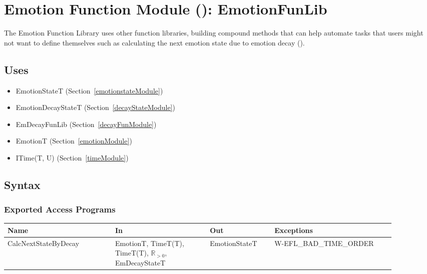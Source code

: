 \section{Emotion Function Module ():
EmotionFunLib}\label{emotionFunModule}

The Emotion Function Library uses other function libraries, building compound
methods that can help automate tasks that users might not want to define
themselves such as calculating the next emotion state due to emotion decay
().

\subsection{Uses}
\begin{itemize}[noitemsep, nosep]

    \item EmotionStateT (Section~\ref{emotionstateModule})

    \item EmotionDecayStateT (Section~\ref{decayStateModule})

    \item EmDecayFunLib (Section~\ref{decayFunModule})

    \item EmotionT (Section~\ref{emotionModule})

    \item ITime(T, U) (Section~\ref{timeModule})

\end{itemize}

\subsection{Syntax}

\subsubsection{Exported Access Programs}

\begin{center}
    \renewcommand{\arraystretch}{1.2}
    \begin{tabular}{m{0.25\linewidth} m{0.22\linewidth} m{0.15\linewidth}
            m{0.28\linewidth}}
        \toprule
        \textbf{Name} & \textbf{In} & \textbf{Out} & \textbf{Exceptions} \\
        \midrule

        \rowcolor[gray]{0.9}CalcNextStateByDecay & EmotionT, TimeT(T),
        TimeT(T), $\mathbb{R}_{>0}$, \newline EmDecayStateT & EmotionStateT &
        W-EFL\_BAD\_TIME\_ORDER \\

        \bottomrule
    \end{tabular}
\end{center}

